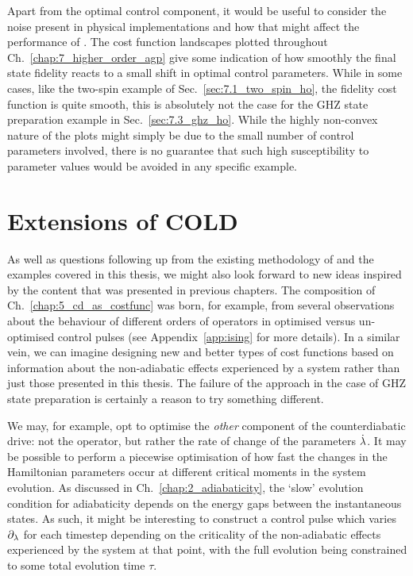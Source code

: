 Apart from the optimal control component, it would be useful to consider the noise present in physical implementations and how that might affect the performance of . The cost function landscapes plotted throughout Ch.~\ref{chap:7_higher_order_agp} give some indication of how smoothly the final state fidelity reacts to a small shift in optimal control parameters. While in some cases, like the two-spin example of Sec.~\ref{sec:7.1_two_spin_ho}, the fidelity cost function is quite smooth, this is absolutely not the case for the GHZ state preparation example in Sec.~\ref{sec:7.3_ghz_ho}. While the highly non-convex nature of the plots might simply be due to the small number of control parameters involved, there is no guarantee that such high susceptibility to parameter values would be avoided in any specific example.


\section{Extensions of COLD}

As well as questions following up from the existing methodology of  and the examples covered in this thesis, we might also look forward to new ideas inspired by the content that was presented in previous chapters. The composition of Ch.~\ref{chap:5_cd_as_costfunc} was born, for example, from several observations about the behaviour of different orders of  operators in optimised versus un-optimised control pulses (see Appendix~\ref{app:ising} for more details). In a similar vein, we can imagine designing new and better types of cost functions based on information about the non-adiabatic effects experienced by a system rather than just those presented in this thesis. The failure of the approach in the case of GHZ state preparation is certainly a reason to try something different.

We may, for example, opt to optimise the \emph{other} component of the counterdiabatic drive: not the  operator, but rather the rate of change of the parameters $\dot{\lambda}$. It may be possible to perform a piecewise optimisation of how fast the changes in the Hamiltonian parameters occur at different critical moments in the system evolution. As discussed in Ch.~\ref{chap:2_adiabaticity}, the `slow' evolution condition for adiabaticity depends on the energy gaps between the instantaneous states. As such, it might be interesting to construct a control pulse which varies $\partial_{\lambda}$ for each timestep depending on the criticality of the non-adiabatic effects experienced by the system at that point, with the full evolution being constrained to some total evolution time $\tau$.

